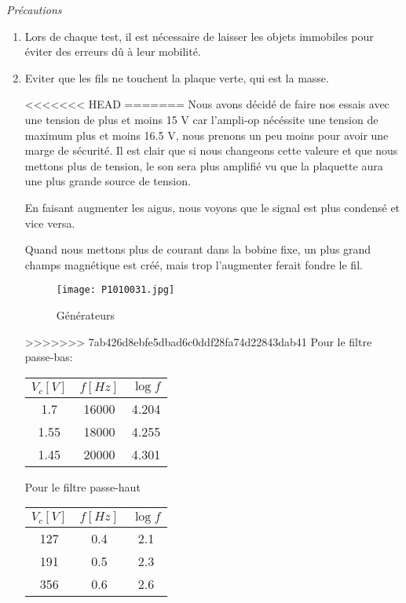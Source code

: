 \emph{Précautions}
\begin{enumerate}
\item Lors de chaque test, il est nécessaire de laisser les objets immobiles pour éviter des erreurs dû à leur mobilité.
\item Eviter que les fils ne touchent la plaque verte, qui est la masse.



<<<<<<< HEAD
=======
Nous avons décidé de faire nos essais avec une tension de plus et moins 15 V car l'ampli-op nécéssite une tension
de maximum plus et moins 16.5 V, nous prenons un peu moins pour avoir une marge de sécurité.
Il est clair que si nous changeons cette valeure et que nous mettons plus de tension, le son sera plus amplifié vu que
la plaquette aura une plus grande source de tension.


En faisant augmenter les aigus, nous voyons que le signal est plus condensé et vice versa.

Quand nous mettons plus de courant dans la bobine fixe, un plus grand champs magnétique est créé, mais trop l'augmenter
ferait fondre le fil.

\begin{figure}[ht!]
    \centering
    \texttt{[image: P1010031.jpg]}
    \caption{Générateurs}
    \label{Branchements des générateurs}
\end{figure}

>>>>>>> 7ab426d8ebfe5dbad6c0ddf28fa74d22843dab41
Pour le filtre passe-bas:
\begin{center}
\begin{tabular}{|c|c|c|}
\hline
$V_c[V]$ & $f[Hz]$ & $\log{f}$ \\
\hline
1.7 & 16000 & 4.204 \\
\hline
1.55 & 18000 & 4.255 \\
\hline
1.45 & 20000 & 4.301 \\
\hline
\end{tabular}
\end{center}

Pour le filtre passe-haut

\begin{center}
\begin{tabular}{|c|c|c|}
\hline
$V_c[V]$ & $f[Hz]$ & $\log{f}$ \\
\hline
127 & 0.4 & 2.1\\
\hline
191 & 0.5 & 2.3\\
\hline
356 & 0.6 & 2.6 \\
\hline
\end{tabular}
\end{center}


\end{enumerate}
